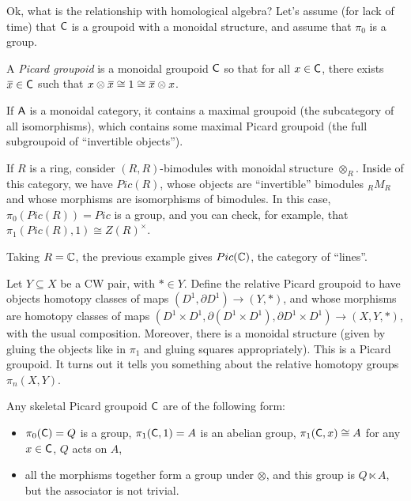 Ok, what is the relationship with homological algebra? Let's assume (for lack of time) that $\text{\sf C}$ is a groupoid with a monoidal structure, and assume that $\pi_0$ is a group.
\begin{definition}
 A \emph{Picard groupoid} is a monoidal groupoid $\text{\sf C}$ so that for all $x\in \text{\sf C}$, there exists $\bbar x\in \C$ such that $x\otimes \bbar x\cong 1\cong \bbar x\otimes x$.
\end{definition}
\begin{example}
 If $\text{\sf A}$ is a monoidal category, it contains a maximal groupoid (the subcategory of all isomorphisms), which contains some maximal Picard groupoid (the full subgroupoid of ``invertible objects'').
\end{example}
\begin{example}
 If $R$ is a ring, consider $(R,R)$-bimodules with monoidal structure $\otimes_R$. Inside of this category, we have $Pic(R)$, whose objects are ``invertible'' bimodules ${}_RM_R$ and whose morphisms are isomorphisms of bimodules. In this case, $\pi_0(Pic(R))=Pic$ is a group, and you can check, for example, that $\pi_1(Pic(R),1)\cong Z(R)^\times$.
\end{example}
\begin{example}
 Taking $R=\mathbb{C}$, the previous example gives $Pic(\mathbb{C})$, the category of ``lines''.
\end{example}
\begin{example}
 Let $Y\subseteq X$ be a CW pair, with $*\in Y$. Define the relative Picard groupoid to have objects homotopy classes of maps $(D^1,\partial D^1)\to (Y,*)$, and whose morphisms are homotopy classes of maps $(D^1\times D^1,\partial( D^1\times D^1),\partial D^1 \times D^1)\to (X,Y,*)$, with the usual composition. Moreover, there is a monoidal structure (given by gluing the objects like in $\pi_1$ and gluing squares appropriately). This is a Picard groupoid. It turns out it tells you something about the relative homotopy groups $\pi_n(X,Y)$.
\end{example}
\begin{theorem}
 Any skeletal Picard groupoid $\text{\sf C}$ are of the following form:
 \begin{itemize}
  \item $\pi_0(\text{\sf C})=Q$ is a group, $\pi_1(\text{\sf C},1)=A$ is an abelian group, $\pi_1(\text{\sf C},x)\cong A$ for any $x\in \text{\sf C}$, $Q$ acts on $A$,
  \item all the morphisms together form a group under $\otimes$, and this group is $Q\ltimes A$, but the associator is not trivial.
 \end{itemize}
\end{theorem}
